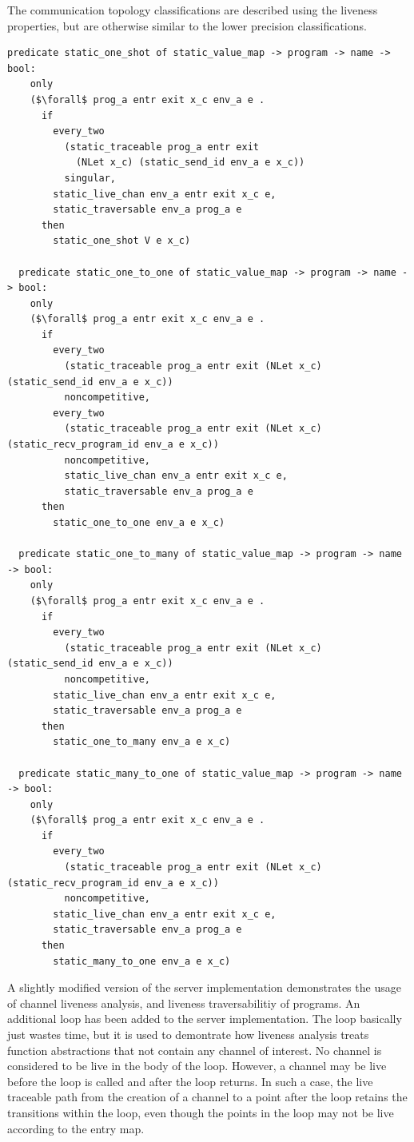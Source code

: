 \documentclass{article}
\begin{document}
The communication topology classifications are described using the liveness properties, but
are otherwise similar to the lower precision classifications.

\begin{lstlisting}[language=logic, mathescape]
  predicate static_one_shot of static_value_map -> program -> name -> bool:
    only
    ($\forall$ prog_a entr exit x_c env_a e . 
      if
        every_two
          (static_traceable prog_a entr exit
            (NLet x_c) (static_send_id env_a e x_c))
          singular, 
        static_live_chan env_a entr exit x_c e, 
        static_traversable env_a prog_a e
      then
        static_one_shot V e x_c)

  predicate static_one_to_one of static_value_map -> program -> name -> bool:
    only
    ($\forall$ prog_a entr exit x_c env_a e .
      if
        every_two
          (static_traceable prog_a entr exit (NLet x_c) (static_send_id env_a e x_c))
          noncompetitive, 
        every_two
          (static_traceable prog_a entr exit (NLet x_c) (static_recv_program_id env_a e x_c))
          noncompetitive,
          static_live_chan env_a entr exit x_c e,
          static_traversable env_a prog_a e
      then
        static_one_to_one env_a e x_c)

  predicate static_one_to_many of static_value_map -> program -> name -> bool:
    only
    ($\forall$ prog_a entr exit x_c env_a e .
      if
        every_two
          (static_traceable prog_a entr exit (NLet x_c) (static_send_id env_a e x_c))
          noncompetitive,
        static_live_chan env_a entr exit x_c e,
        static_traversable env_a prog_a e
      then
        static_one_to_many env_a e x_c)

  predicate static_many_to_one of static_value_map -> program -> name -> bool:
    only
    ($\forall$ prog_a entr exit x_c env_a e .
      if
        every_two
          (static_traceable prog_a entr exit (NLet x_c) (static_recv_program_id env_a e x_c))
          noncompetitive, 
        static_live_chan env_a entr exit x_c e,
        static_traversable env_a prog_a e
      then
        static_many_to_one env_a e x_c)
  \end{lstlisting}


A slightly modified version of the server implementation demonstrates the usage of channel liveness
analysis, and liveness traversabilitiy of programs.  An additional loop has been added to the
server implementation.  The loop basically just wastes time, but it is used to demontrate how
liveness analysis treats function abstractions that not contain
any channel of interest.  No channel is
considered to be live in the body of the loop.  However, a channel may be live before the loop is
called and after the loop returns.  In such a case, the live traceable path from the creation of a
channel to a point after the loop retains the transitions within the loop, even though the points in
the loop may not be live according to the entry map.
\end{document}

